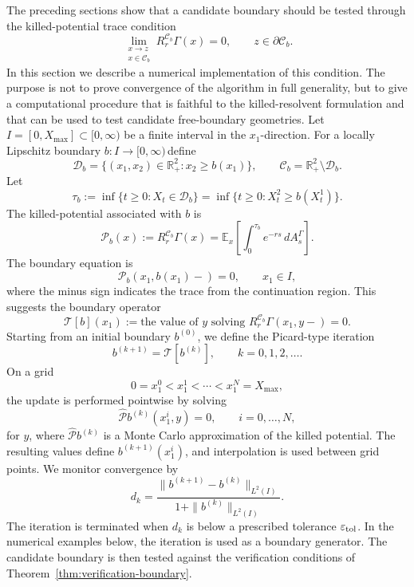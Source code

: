 \documentclass[pdflatex,sn-mathphys-num]{sn-jnl}
\theoremstyle{plain}
\theoremstyle{definition}
\theoremstyle{remark}
\numberwithin{equation}{section}
\begin{document}
The preceding sections show that a candidate boundary should be tested through the killed-potential trace condition 
\[ 
\lim_{\substack{x\to z\\ x\in\mathcal C_b}} R_r^{\mathcal C_b}\Gamma(x)=0, \qquad z\in\partial\mathcal C_b . 
\] 
In this section we describe a numerical implementation of this condition. The purpose is not to prove convergence of the algorithm in full generality, but to give a computational procedure that is faithful to the killed-resolvent formulation and that can be used to test candidate free-boundary geometries. Let \(I=[0,X_{\max}]\subset[0,\infty)\) be a finite interval in the \(x_1\)-direction. For a locally Lipschitz boundary \(b:I\to[0,\infty)\)\,define 
\[ 
\mathcal D_b = \{(x_1,x_2)\in\mathbb R_+^2:x_2\ge b(x_1)\}, \qquad \mathcal C_b = \mathbb R_+^2\setminus\mathcal D_b . 
\] 
Let 
\[ 
\tau_b:=\inf\{t\ge0:X_t\in\mathcal D_b\} = \inf\{t\ge0:X_t^2\ge b(X_t^1)\}. 
\] 
The killed-potential associated with \(b\) is 
\[ 
\mathcal P_b(x) := R_r^{\mathcal C_b}\Gamma(x) = \mathbb E_x \left[ \int_0^{\tau_b}e^{-rs}\,dA_s^\Gamma \right]. 
\] 
The boundary equation is 
\[ 
\mathcal P_b(x_1,b(x_1)-)=0, \qquad x_1\in I, 
\] 
where the minus sign indicates the trace from the continuation region. This suggests the boundary operator 
\[
\mathcal T[b](x_1) := \text{the value of }y\text{ solving } R_r^{\mathcal C_b}\Gamma(x_1,y-)=0 . 
\]
Starting from an initial boundary \(b^{(0)}\), we define the Picard-type iteration 
\begin{equation} \label{eq:picard-boundary} 
b^{(k+1)}=\mathcal T[b^{(k)}], \qquad k=0,1,2,\ldots . 
\end{equation} 
On a grid 
\[ 
0=x_1^0<x_1^1<\cdots<x_1^N=X_{\max}, 
\] 
the update is performed pointwise by solving  
\[
\widehat{\mathcal P}{b^{(k)}}(x_1^i,y)=0, \qquad i=0,\ldots,N, 
\]
for \(y\), where \(\widehat{\mathcal P}{b^{(k)}}\) is a Monte Carlo approximation of the killed potential. The resulting values define \(b^{(k+1)}(x_1^i)\), and interpolation is used between grid points. We monitor convergence by 
\begin{equation} \label{eq:dk} 
d_k = \frac{ \|b^{(k+1)}-b^{(k)}\|_{L^2(I)} }{ 1+\|b^{(k)}\|_{L^2(I)} } . 
\end{equation} 
The iteration is terminated when \(d_k\) is below a prescribed tolerance \(\varepsilon_{\rm tol}\). In the numerical examples below, the iteration is used as a boundary generator. The candidate boundary is then tested against the verification conditions of Theorem~\ref{thm:verification-boundary}. 
\end{document}
